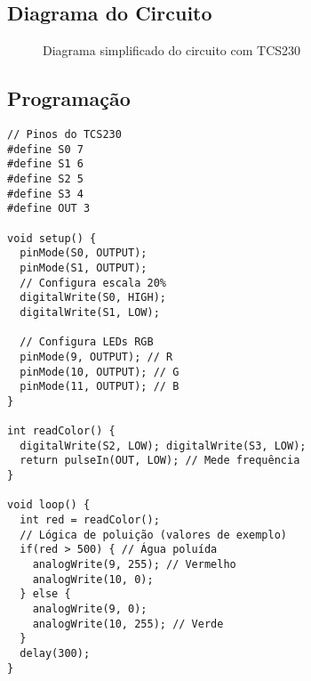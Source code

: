 \documentclass[12pt]{article}
\begin{document}
\subsection{Diagrama do Circuito}
\begin{figure}[ht]
\centering
{}
\caption{Diagrama simplificado do circuito com TCS230}
\end{figure}

\subsection{Programação}
\begin{verbatim}
// Pinos do TCS230
#define S0 7
#define S1 6
#define S2 5
#define S3 4
#define OUT 3

void setup() {
  pinMode(S0, OUTPUT);
  pinMode(S1, OUTPUT);
  // Configura escala 20%
  digitalWrite(S0, HIGH);
  digitalWrite(S1, LOW);
  
  // Configura LEDs RGB
  pinMode(9, OUTPUT); // R
  pinMode(10, OUTPUT); // G
  pinMode(11, OUTPUT); // B
}

int readColor() {
  digitalWrite(S2, LOW); digitalWrite(S3, LOW);
  return pulseIn(OUT, LOW); // Mede frequência
}

void loop() {
  int red = readColor();
  // Lógica de poluição (valores de exemplo)
  if(red > 500) { // Água poluída
    analogWrite(9, 255); // Vermelho
    analogWrite(10, 0);
  } else {
    analogWrite(9, 0);
    analogWrite(10, 255); // Verde
  }
  delay(300);
}
\end{verbatim}
\end{document}
